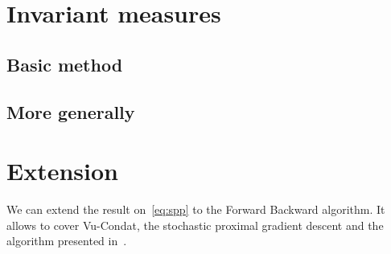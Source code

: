 \documentclass{article}
\newcommand{\1}{\mathbbm 1}
\theoremstyle{definition}
\begin{document}
\section{Invariant measures}

\subsection{Basic method}

\subsection{More generally}



\section{Extension}

We can extend the result on~\ref{eq:spp} to the Forward Backward algorithm. It allows to cover Vu-Condat, the stochastic proximal gradient descent and the algorithm presented in~\cite{salim2018splitting}.
\end{document}
